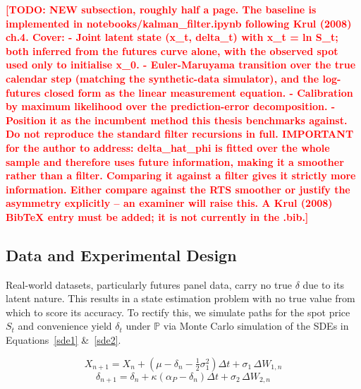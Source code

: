 \documentclass[11pt, a4paper]{article}
\newcommand{\todo}[1]{\textcolor{red}{\textbf{[TODO: #1]}}}
\begin{document}
\todo{NEW subsection, roughly half a page. The baseline is implemented in
  notebooks/kalman\_filter.ipynb following Krul (2008) ch.4. Cover:
  - Joint latent state (x\_t, delta\_t) with x\_t = ln S\_t; both inferred from the
    futures curve alone, with the observed spot used only to initialise x\_0.
  - Euler-Maruyama transition over the true calendar step (matching the
    synthetic-data simulator), and the log-futures closed form as the linear
    measurement equation.
  - Calibration by maximum likelihood over the prediction-error decomposition.
  - Position it as the incumbent method this thesis benchmarks against.
  Do not reproduce the standard filter recursions in full.
  IMPORTANT for the author to address: delta\_hat\_phi is fitted over the whole
  sample and therefore uses future information, making it a smoother rather than
  a filter. Comparing it against a filter gives it strictly more information.
  Either compare against the RTS smoother or justify the asymmetry explicitly --
  an examiner will raise this.
  A Krul (2008) BibTeX entry must be added; it is not currently in the .bib.}

\subsection{Data and Experimental Design}
\label{sec:experimental_design}

Real-world datasets, particularly futures panel data, carry no true $\delta$ due to its latent nature. This results in a state estimation problem with no true value from which to score its accuracy. To rectify this, we simulate paths for the spot price $S_t$ and convenience yield $\delta_t$ under $\mathbb{P}$ via Monte Carlo simulation of the SDEs in Equations~\ref{sde1} \&~\ref{sde2}. 

\begin{equation}
X_{n+1} = X_n + \left(\mu - \delta_n - \tfrac{1}{2}\sigma_1^2\right)\Delta t + \sigma_1\,\Delta W_{1,n}
\label{eq:x_discrete_em}
\end{equation}
\begin{equation}
    \delta_{n+1} = \delta_n + \kappa\left(\alpha_P - \delta_n\right)\Delta t + \sigma_2\,\Delta W_{2,n}
    \label{eq:delta_discrete_em}
\end{equation}
\end{document}
